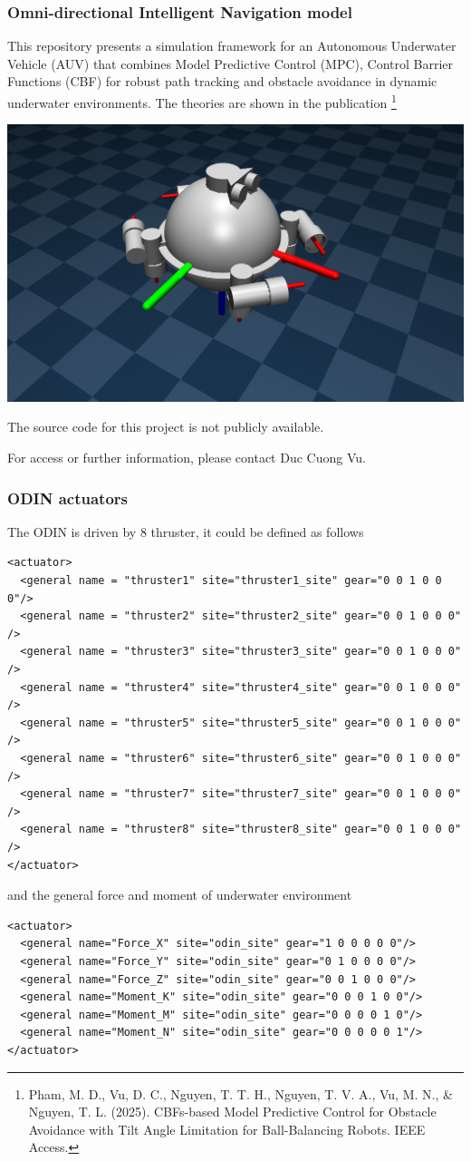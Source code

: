 \documentclass[9pt]{beamer}
\begin{document}
			\begin{frame}[fragile]
				\frametitle{Omni-directional Intelligent Navigation model}
				This repository presents a simulation framework for an Autonomous Underwater Vehicle (AUV) that combines Model Predictive Control (MPC), Control Barrier Functions (CBF) for robust path tracking and obstacle avoidance in dynamic underwater environments. The theories are shown in the publication \footnote{Pham, M. D., Vu, D. C., Nguyen, T. T. H., Nguyen, T. V. A., Vu, M. N., \& Nguyen, T. L. (2025). CBFs-based Model Predictive Control for Obstacle Avoidance with Tilt Angle Limitation for Ball-Balancing Robots. IEEE Access.}
				
				\begin{center}
					\includegraphics[width=0.5\linewidth]{images/mjc-odin}
				\end{center}
				The source code for this project is not publicly available.
				
				For access or further information, please contact Duc Cuong Vu.
			\end{frame}
		
		
		\begin{frame}[fragile]
			\frametitle{ODIN actuators}
			The ODIN is driven by 8 thruster, it could be defined as follows
				\begin{verbatim}
<actuator>
  <general name = "thruster1" site="thruster1_site" gear="0 0 1 0 0 0"/>
  <general name = "thruster2" site="thruster2_site" gear="0 0 1 0 0 0" />
  <general name = "thruster3" site="thruster3_site" gear="0 0 1 0 0 0" />
  <general name = "thruster4" site="thruster4_site" gear="0 0 1 0 0 0" />
  <general name = "thruster5" site="thruster5_site" gear="0 0 1 0 0 0" />
  <general name = "thruster6" site="thruster6_site" gear="0 0 1 0 0 0" />
  <general name = "thruster7" site="thruster7_site" gear="0 0 1 0 0 0" />
  <general name = "thruster8" site="thruster8_site" gear="0 0 1 0 0 0" />
</actuator>	
			\end{verbatim}
		and the general force and moment of underwater environment
			\begin{verbatim}
<actuator>
  <general name="Force_X" site="odin_site" gear="1 0 0 0 0 0"/>
  <general name="Force_Y" site="odin_site" gear="0 1 0 0 0 0"/>
  <general name="Force_Z" site="odin_site" gear="0 0 1 0 0 0"/>
  <general name="Moment_K" site="odin_site" gear="0 0 0 1 0 0"/>
  <general name="Moment_M" site="odin_site" gear="0 0 0 0 1 0"/>
  <general name="Moment_N" site="odin_site" gear="0 0 0 0 0 1"/>
</actuator>
		\end{verbatim}

			
		\end{frame}
			
\end{document}
